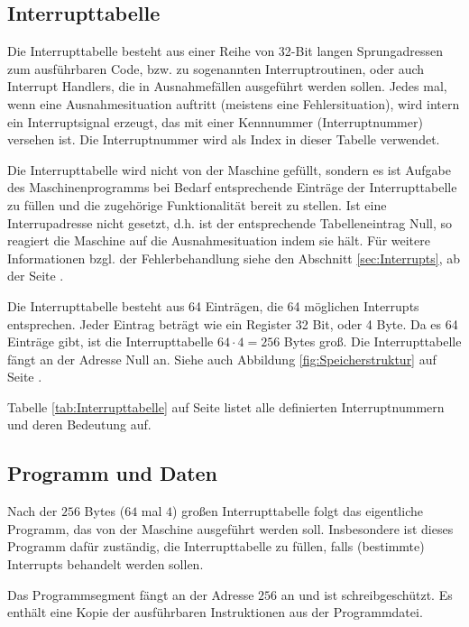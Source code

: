 \subsection{Interrupttabelle}
\label{subsubsec:Interrupttabelle}

Die Interrupttabelle besteht aus einer Reihe von 32-Bit langen Sprungadressen
zum ausführbaren Code, bzw. zu sogenannten Interruptroutinen, oder auch \glqq
Interrupt Handlers\grqq, die in Ausnahmefällen ausgeführt werden sollen. Jedes
mal, wenn eine Ausnahmesituation auftritt (meistens eine Fehlersituation), wird
intern ein Interruptsignal erzeugt, das mit einer Kennnummer (Interruptnummer)
versehen ist. Die Interruptnummer wird als Index in dieser Tabelle verwendet.


Die Interrupttabelle wird nicht von der Maschine gefüllt, sondern es ist
Aufgabe des Maschinenprogramms bei Bedarf entsprechende Einträge der
Interrupttabelle zu füllen und die zugehörige Funktionalität bereit zu stellen.
Ist eine Interrupadresse nicht gesetzt, d.h. ist der entsprechende
Tabelleneintrag Null, so reagiert die Maschine auf die Ausnahmesituation
indem sie hält. Für weitere Informationen bzgl. der Fehlerbehandlung siehe den
Abschnitt \ref{sec:Interrupts}, ab der Seite \pageref{sec:Interrupts}.

Die Interrupttabelle besteht aus 64 Einträgen, die 64 möglichen Interrupts
entsprechen. Jeder Eintrag beträgt wie ein Register 32 Bit, oder 4 Byte. Da es
64 Einträge gibt, ist die Interrupttabelle $64 \cdot 4 = 256$ Bytes groß. Die
Interrupttabelle fängt an der Adresse Null an. Siehe auch Abbildung
\ref{fig:Speicherstruktur} auf Seite \pageref{fig:Speicherstruktur}.


Tabelle \ref{tab:Interrupttabelle} auf Seite \pageref{tab:Interrupttabelle}
listet alle definierten Interruptnummern und deren
Bedeutung auf.


\subsection{Programm und Daten}
\label{subsec:Prog-Daten}

Nach der $256$ Bytes ($64$ mal $4$) großen Interrupttabelle
folgt das eigentliche Programm, das von der Maschine ausgeführt werden soll.
Insbesondere ist dieses Programm dafür zuständig, die Interrupttabelle zu
füllen, falls (bestimmte) Interrupts behandelt werden sollen.


Das Programmsegment fängt an der Adresse $256$ an und ist
schreibgeschützt. Es enthält eine Kopie der ausführbaren Instruktionen aus
der Programmdatei.

